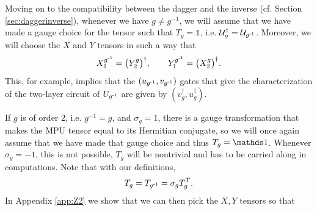 \documentclass[reprint,
superscriptaddress,
amsmath,amssymb,
notitlepage,
aps,
prb,
10pt, 
tightenlines
]{revtex4-2}
\begin{document}
Moving on to the compatibility between the dagger and the inverse (cf. Section \ref{sec:daggerinverse}), whenever we have $g\neq g^{-1}$, we will assume that we have made a gauge choice for the tensor such that $T_g=\mathds{1}$, i.e. $\mathcal{U}_g^\dagger = \mathcal{U}_{g^{\text{-}1}}$. Moreover, we will choose the $X$ and $Y$ tensors in such a way that 
\begin{equation}
X_{1}^{g^{\text{-}1}}=\bigl(Y_{2}^g\bigr)^\dagger,\qquad Y_{1}^{g^{\text{-}1}}=\bigl(X_{2}^g\bigr)^\dagger.
    \label{eq:compat}
\end{equation}
This, for example, implies that the $(u_{g^{\text{-}1}},v_{g^{\text{-}1}})$ gates that give the characterization of the two-layer circuit of $U_{g^{\text{-}1}}$ are given by $(v^\dagger_{g},u^\dagger_{g})$.

If $g$ is of order $2$, i.e. $g^{-1} = g$, and $\sigma_g=1$, there is a gauge transformation that makes the MPU tensor equal to its Hermitian conjugate, so we will once again assume that we have made that gauge choice and thus $T_g=\I$. Whenever $\sigma_g = -1$, this is not possible, $T_g$ will be nontrivial and has to be carried along in computations. Note that with our definitions,
\begin{equation}
    T_g = T_{g^{\text{-}1}} = \sigma_g T^T_{g}.
\end{equation}
In Appendix \ref{app:Z2} we show that we can then pick the $X,Y$ tensors so that
\end{document}
